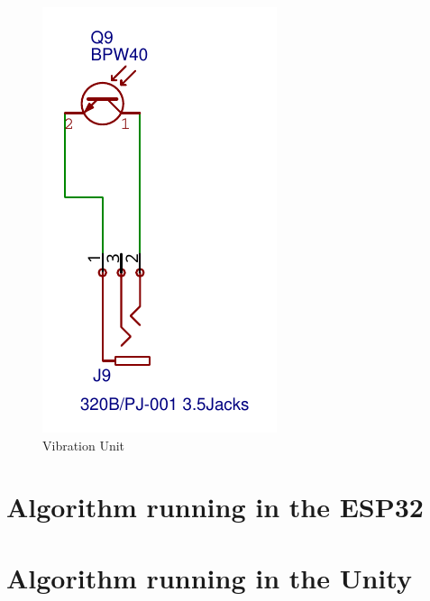     \begin{figure}[htbp]
        \centering
        \hspace{1cm}
        \includegraphics[width=.45\textwidth]{ApendD (Cinto)/Unidade Vibracao.pdf}
        \caption{Vibration Unit}
        \label{vibration_unit}
    \end{figure}
    
\pagebreak
    
\section{Algorithm running in the ESP32}


\section{Algorithm running in the Unity}

